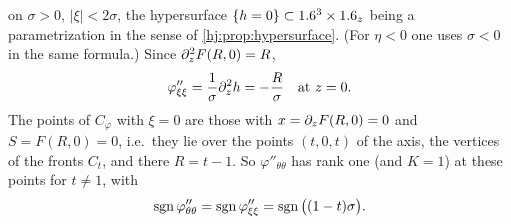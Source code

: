on $\sigma>0$, $|\xi|<2\sigma$, the hypersurface $\{h=0\}\subset1.6^3\times1.6_z$
being a parametrization in the sense of \cref{hj:prop:hypersurface}.
(For $\eta<0$ one uses $\sigma<0$ in the same formula.)  Since
$\partial_z^2F(R,0)=R$,
\begin{equation*}
  \varphi''_{\xi\xi}=\frac1\sigma\partial_z^2h=-\frac{R}\sigma\quad\text{at }z=0 .
\end{equation*}
The points of $C_\varphi$ with $\xi=0$ are those with $x=\partial_zF(R,0)=0$ and
$S=F(R,0)=0$, i.e.\ they lie over the points $(t,0,t)$ of the axis, the
vertices of the fronts $C_t$, and there $R=t-1$.  So $\varphi''_{\theta\theta}$
has rank one (and $K=1$) at these points for $t\ne1$, with
\begin{equation}\label{hj:eq:keller-sign}
  \operatorname{sgn}\varphi''_{\theta\theta}=\operatorname{sgn}\varphi''_{\xi\xi}=\operatorname{sgn}\big((1-t)\sigma\big).
\end{equation}


